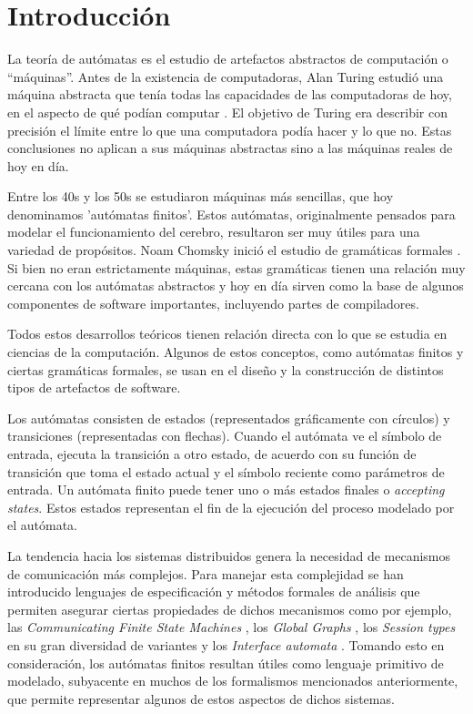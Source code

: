 \section{Introducción}
La teoría de autómatas es el estudio de artefactos abstractos de computación o ``máquinas''. Antes de la existencia de computadoras, Alan Turing estudió una máquina abstracta que tenía todas las capacidades de las computadoras de hoy, en el aspecto de qué podían computar \cite{turing:plms-s2-42_1,turing:plms-s2-43_1}. El objetivo de Turing era describir con precisión el límite entre lo que una computadora podía hacer y lo que no. Estas conclusiones no aplican a sus máquinas abstractas sino a las máquinas reales de hoy en día\cite{ullman}.

Entre los 40s y los 50s se estudiaron máquinas más sencillas, que hoy denominamos 'autómatas finitos'. Estos autómatas, originalmente pensados para modelar el funcionamiento del cerebro, resultaron ser muy útiles para una variedad de propósitos. Noam Chomsky inició el estudio de gramáticas formales \cite{chomsky:iretit-2_3}. Si bien no eran estrictamente máquinas, estas gramáticas tienen una relación muy cercana con los autómatas abstractos y hoy en día sirven como la base de algunos componentes de software importantes, incluyendo partes de compiladores.

Todos estos desarrollos teóricos tienen relación directa con lo que se estudia en ciencias de la computación. Algunos de estos conceptos, como autómatas finitos y ciertas gramáticas formales, se usan en el diseño y la construcción de distintos tipos de artefactos de software.

Los autómatas consisten de estados (representados gráficamente con círculos) y transiciones (representadas con flechas). Cuando el autómata ve el símbolo de entrada, ejecuta la transición a otro estado, de acuerdo con su función de transición que toma el estado actual y el símbolo reciente como parámetros de entrada. Un autómata finito puede tener uno o más estados finales o \emph{accepting states}. Estos estados representan el fin de la ejecución del proceso modelado por el autómata.

La tendencia hacia los sistemas distribuidos genera la necesidad de mecanismos de comunicación más complejos. Para manejar esta complejidad se han introducido lenguajes de especificación y métodos formales de análisis que permiten asegurar ciertas propiedades de dichos mecanismos como por ejemplo, las \emph{Communicating Finite State Machines} \cite{CFSM}, los \emph{Global Graphs} \cite{castagna:lmcs-8_1}, los \emph{Session types} en su gran diversidad de variantes \cite{honda:esop98,honda:popl08} y los \emph{Interface automata} \cite{dealfaro:esec-fse-01}. Tomando esto en consideración, los autómatas finitos resultan útiles como lenguaje primitivo de modelado, subyacente en muchos de los formalismos mencionados anteriormente, que permite representar algunos de estos aspectos de dichos sistemas.

